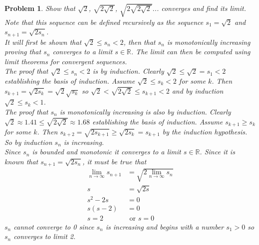 \documentclass{article}
\newtheorem*{Problem}{Problem}
\begin{document}
\begin{Problem}
Show that $\sqrt{2}$, $\sqrt{2\sqrt{2}}$, $\sqrt{2\sqrt{2\sqrt{2}}}$... converges and find its limit. \\
Note that this sequence can be defined recursively as the sequence $s_1=\sqrt{2}$ and $s_{n+1}=\sqrt{2s_n}$. \\
It will first be shown that $\sqrt{2}\leq s_n<2$, then that $s_n$ is monotonically increasing proving that $s_n$ converges to a limit $s\in\mathbb{R}$.  The limit can then be computed using limit theorems for convergent sequences.\\
The proof that $\sqrt{2}\leq s_n<2$ is by induction.  Clearly $\sqrt{2}\leq\sqrt{2}=s_1<2$ establishing the basis of induction.  Assume $\sqrt{2}\leq s_k<2$ for some $k$. Then $s_{k+1}=\sqrt{2s_k}=\sqrt{2}\sqrt{s_k}$ so $\sqrt{2}<\sqrt{2\sqrt{2}}\leq s_{k+1}<2$ and by induction $\sqrt{2}\leq s_k<1$. \\
The proof that $s_n$ is monotonically increasing is also by induction.  Clearly $\sqrt{2}\approx 1.41\leq\sqrt{2\sqrt{2}}\approx1.68$ establishing the basis of induction.  Assume $s_{k+1}\geq s_k$ for some $k$.  Then $s_{k+2}=\sqrt{2s_{k+1}}\geq\sqrt{2s_k}=s_{k+1}$ by the induction hypothesis.  So by induction $s_n$ is increasing. \\
Since $s_n$ is bounded and monotonic it converges to a limit $s\in\mathbb{R}$.  Since it is known that $s_{n+1}=\sqrt{2s_n}$, it must be true that
\begin{align*}
    \lim_{n\to\infty}s_{n+1}&=\sqrt{2\lim_{n\to\infty}s_n} \\
    s&=\sqrt{2s} \\
    s^2-2s&=0 \\
    s(s-2)&=0 \\
    s=2 & \text{ or } s=0
\end{align*}
$s_n$ cannot converge to 0 since $s_n$ is increasing and begins with a number $s_1>0$ so $s_n$ converges to limit 2.
\end{Problem}
\end{document}
